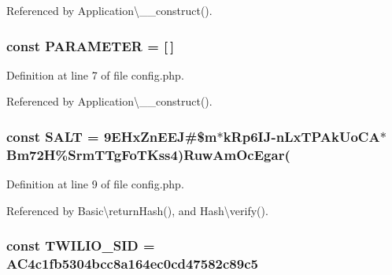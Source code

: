 Referenced by Application\textbackslash{}\+\_\+\+\_\+construct().

\hypertarget{config_8php_a75466fbd8ac40be3d3c185c9974118e7}{}
\subsubsection[{P\+A\+R\+A\+M\+E\+T\+E\+R}]{\setlength{\rightskip}{0pt plus 5cm}const P\+A\+R\+A\+M\+E\+T\+E\+R = \mbox{[}$\,$\mbox{]}}\label{config_8php_a75466fbd8ac40be3d3c185c9974118e7}


Definition at line 7 of file config.\+php.



Referenced by Application\textbackslash{}\+\_\+\+\_\+construct().

\hypertarget{config_8php_a6d448b74f10f8080293b329a47a046b4}{}
\subsubsection[{S\+A\+L\+T}]{\setlength{\rightskip}{0pt plus 5cm}const S\+A\+L\+T = \textquotesingle{}9\+E\+Hx\+Zn\+E\+E\+J\#\$m$\ast$k\+Rp6\+I\+J-\/n\+Lx\+T\+P\+Ak\+Uo\+C\+A$\ast$\+Bm72\+H\%\+Srm\+T\+Tg\+Fo\+T\+Kss4)\+Ruw\+Am\+Oc\+Egar(\textquotesingle{}}\label{config_8php_a6d448b74f10f8080293b329a47a046b4}


Definition at line 9 of file config.\+php.



Referenced by Basic\textbackslash{}return\+Hash(), and Hash\textbackslash{}verify().

\hypertarget{config_8php_a9b6aafbdebd605cd4fb6f5749b53e59f}{}
\subsubsection[{T\+W\+I\+L\+I\+O\+\_\+\+S\+I\+D}]{\setlength{\rightskip}{0pt plus 5cm}const T\+W\+I\+L\+I\+O\+\_\+\+S\+I\+D = \textquotesingle{}A\+C4c1fb5304bcc8a164ec0cd47582c89c5\textquotesingle{}}\label{config_8php_a9b6aafbdebd605cd4fb6f5749b53e59f}


